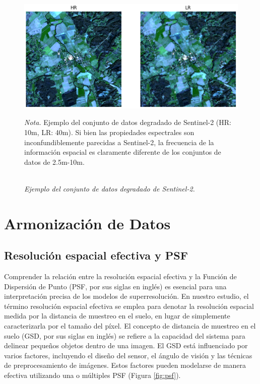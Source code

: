 \begin{figure}[H] 
    \caption{\doublespacing \\ \textit{Ejemplo del conjunto de datos degradado de Sentinel-2.}} 
    \centering
    \includegraphics[width=1\linewidth]{images/sen2_degr.png}
    \begin{justify}
        \textit{Nota.} Ejemplo del conjunto de datos degradado de Sentinel-2 (HR: 10m, LR: 40m). Si bien las propiedades espectrales son inconfundiblemente parecidas a Sentinel-2, la frecuencia de la información espacial es claramente diferente de los conjuntos de datos de 2.5m-10m.
    \end{justify}                    
    \label{fig:sen2_degraded}
\end{figure}

\section{Armonización de Datos}

\subsection{Resolución espacial efectiva y PSF}

Comprender la relación entre la resolución espacial efectiva y la Función de Dispersión de Punto (PSF, por sus siglas en inglés) es esencial para una interpretación precisa de los modelos de superresolución. En nuestro estudio, el término resolución espacial efectiva se emplea para denotar la resolución espacial medida por la distancia de muestreo en el suelo, en lugar de simplemente caracterizarla por el tamaño del píxel. El concepto de distancia de muestreo en el suelo (GSD, por sus siglas en inglés) se refiere a la capacidad del sistema para delinear pequeños objetos dentro de una imagen. El GSD está influenciado por varios factores, incluyendo el diseño del sensor, el ángulo de visión y las técnicas de preprocesamiento de imágenes. Estos factores pueden modelarse de manera efectiva utilizando una o múltiples PSF (Figura \ref{fig:psf}).

